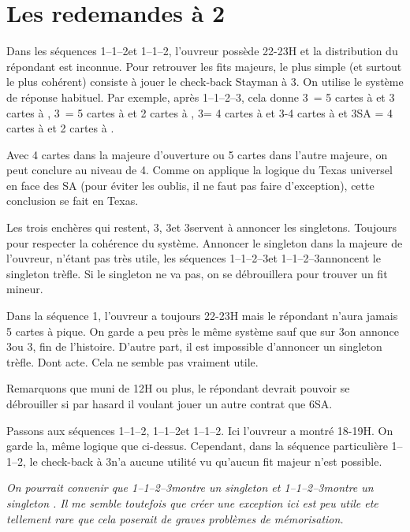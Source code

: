 \documentclass[a4paper,12pt, french]{article}
\newcommand{\T}{\Cl}
\newcommand{\K}{\Di}
\newcommand{\C}{\He}
\renewcommand{\P}{\Sp}
\begin{document}
\section{Les redemandes à 2\NT}

Dans les séquences 1\T--1\P--2\NT et 1\K--1\P--2\NT, l'ouvreur possède 22-23H et la distribution du répondant est inconnue. Pour retrouver les fits majeurs, le plus simple (et surtout le plus cohérent) consiste à jouer le check-back Stayman à 3\T. On utilise le système de réponse habituel. Par exemple, après 1\T--1\P--2\NT--3\T, cela donne 3\K\ = 5 cartes à \C et 3 cartes à \P, 3\C\ = 5 cartes à \C et 2 cartes à \P, 3\P = 4 cartes à \C et 3-4 cartes à \P et 3SA = 4 cartes à \C et 2 cartes à \P.

Avec 4 cartes dans la majeure d'ouverture ou 5 cartes dans l'autre majeure, on peut conclure au niveau de 4. Comme on applique la logique du Texas universel en face des SA (pour éviter les oublis, il ne faut pas faire d'exception), cette conclusion se fait en Texas.

Les trois enchères qui restent, 3\K, 3\C et 3\P servent à annoncer les singletons. Toujours pour respecter la cohérence du système. Annoncer le singleton dans la majeure de l'ouvreur, n'étant pas très utile, les séquences 1\T--1\P--2\NT--3\C et 1\K--1\P--2\NT--3\P  annoncent le singleton trèfle. Si le singleton ne va pas, on se débrouillera pour trouver un fit mineur.

Dans la séquence 1\C-1\P-2\NT, l'ouvreur a toujours 22-23H mais le répondant n'aura jamais 5 cartes à pique. On garde a peu près le même système sauf que sur 3\T on annonce 3\C ou 3\NT, fin de l'histoire. D'autre part, il est impossible d'annoncer un singleton trèfle. Dont acte. Cela ne semble pas vraiment utile.

Remarquons que muni de 12H ou plus, le répondant devrait pouvoir se débrouiller si par hasard il voulant jouer un autre contrat que 6SA.

Passons aux séquences 1\T--1\K--2\NT, 1\T--1\C--2\NT et 1\K--1\C--2\NT. Ici l'ouvreur a montré 18-19H. On garde la, même logique que ci-dessus. Cependant, dans la séquence particulière 1\T--1\K--2\NT, le check-back à 3\T n'a aucune utilité vu qu'aucun fit majeur n'est possible. 

\textit{On pourrait convenir que 1\T--1\K--2\NT--3\T montre un singleton \T et 1\T--1\K--2\NT--3\C montre un singleton \C. Il me semble toutefois que créer une exception ici est peu utile ete tellement rare que cela poserait de graves problèmes de mémorisation.}
\end{document}
